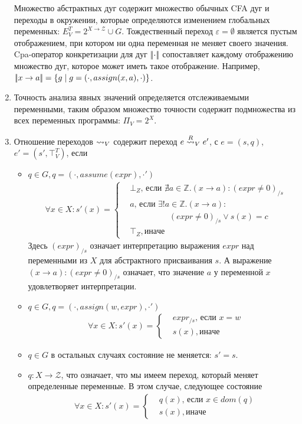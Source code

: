 \begin{enumerate}
Множество абстрактных дуг содержит множество обычных CFA дуг и переходы в окружении, которые определяются изменением глобальных переменных:
$E^T_V = 2^{X \to \mathcal{Z}} \cup G$.
Тождественный переход $\varepsilon = \emptyset$ является пустым отображением, при котором ни одна переменная не меняет своего значения.
Cpa-оператор конкретизации для дуг $\lvert \! \lvert \cdot \rvert \! \rvert$ сопоставляет каждому отображению множество дуг, которое может иметь такое отображение.
Например, $\lvert \! \lvert x \to a \rvert \! \rvert = \{g \mid g = (\cdot, assign(x, a), \cdot)\}$.

\item Точность анализа явных значений определяется отслеживаемыми переменными, таким образом множество точности содержит подмножества из всех переменных программы:  $\Pi_V = 2^X$.

\item Отношение переходов $\leadsto_V$ содержит переход $e \stackrel{R}{\leadsto}_V e'$, с $e=(s,q)$, $e' =(s', \top^T_V)$, если 
\begin{itemize}
\item $q \in G, q=(\cdot,assume(expr),\cdot')$ 
\begin{align*}
&\forall x \in X: s'(x) = 
\begin{cases}
& \bot_Z \mbox{, если } \nexists a \in \mathbb{Z}. (x \rightarrow a) : (expr\neq 0)_{/s} \\
& a \mbox{, если } \exists !a \in \mathbb{Z}. (x \rightarrow a) : \\
& \hspace{2cm} (expr\neq 0)_{/s} \lor s(x) = c \\
& \top_Z{, иначе }
\end{cases}
\end{align*}
Здесь $(expr)_{/s}$ означает интерпретацию выражения $expr$ над переменными из $X$ для абстрактного присваивания $s$.
А выражение $(x \rightarrow a) : (expr\neq 0)_{/s}$ означает, что значение $a$ у переменной $x$ удовлетворяет интерпретации.
\item $q \in G, q=(\cdot,assign(w, expr),\cdot')$ 
\begin{align*}
&\forall x \in X: s'(x) = 
\begin{cases}
& expr_{/s} \mbox{, если } x = w \\
& s(x){, иначе }
\end{cases}
\end{align*}
\item $q \in G$ в остальных случаях состояние не меняется: $s' = s$. 
\item $q: X \to \mathcal{Z}$, что означает, что мы имеем переход, который меняет определенные переменные.
В этом случае, следующее состояние
\begin{align*}
&\forall x \in X: s'(x) = 
\begin{cases}
& q(x) \mbox{, если } x \in dom(q) \\
& s(x){, иначе }
\end{cases}
\end{align*}
\end{itemize}


\end{enumerate}
